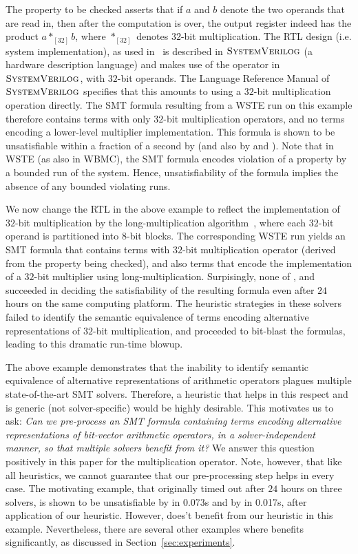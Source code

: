 The property to be checked asserts that if $a$ and $b$ denote the two
operands that are read in, then after the computation is over, the
output register indeed has the product $a *_{[32]} b$, where
$*_{[32]}$ denotes $32$-bit multiplication.  The RTL design
(i.e. system implementation), as used in~\cite{wste} is described in $\textsc{SystemVerilog}$
(a hardware description language) and makes use of the
{\tt *} operator in $\textsc{SystemVerilog}$, with $32$-bit operands.  The Language
Reference Manual of $\textsc{SystemVerilog}$ specifies that this amounts to using a
$32$-bit multiplication operation directly.  The SMT formula resulting
from a WSTE run on this example therefore contains terms with only
$32$-bit multiplication operators, and no terms encoding a lower-level
multiplier implementation.  This formula is shown to be unsatisfiable
within a fraction of a second by {\boolector} (and also by {\cvcfour}
and {\zthree}).  Note that in WSTE (as also in WBMC), the SMT formula
encodes violation of a property by a bounded run of the system. Hence,
unsatisfiability of the formula implies the absence of any bounded
violating runs.

We now change the RTL in the above example to reflect the
implementation of $32$-bit multiplication by the long-multiplication
algorithm~\cite{long}, where each $32$-bit operand is partitioned into
$8$-bit blocks.  The corresponding WSTE run yields an SMT formula that
contains terms with $32$-bit multiplication operator (derived from the
property being checked), and also terms that encode the implementation
of a $32$-bit multiplier using long-multiplication.  Surpisingly, none
of {\boolector}, {\cvcfour} and {\zthree} succeeded in deciding the
satisfiability of the resulting formula even after $24$ hours on the
same computing platform.  The heuristic strategies in these solvers
failed to identify the semantic equivalence of terms encoding
alternative representations of $32$-bit multiplication, and proceeded
to bit-blast the formulas, leading to this dramatic run-time blowup.

The above example demonstrates that the inability to identify semantic
equivalence of alternative representations of arithmetic operators
plagues multiple state-of-the-art SMT solvers.  Therefore, a heuristic
that helps in this respect and is generic (not solver-specific) would
be highly desirable.  This motivates us to ask: \emph{Can we
pre-process an SMT formula containing terms encoding alternative
representations of bit-vector arithmetic operators, in a
solver-independent manner, so that multiple solvers benefit from it?}
We answer this question positively in this paper for the
multiplication operator.  Note, however, that like all heuristics, we
cannot guarantee that our pre-processing step helps in every case.
The motivating example, that originally timed out after $24$ hours on
three solvers, is shown to be unsatisfiable by {\zthree} in 0.073s and
by {\cvcfour} in 0.017s, after application of our heuristic. However,
{\boolector} does't benefit from our heuristic in this example.
Nevertheless, there are several other examples where {\boolector}
benefits significantly, as discussed in Section~\ref{sec:experiments}.

